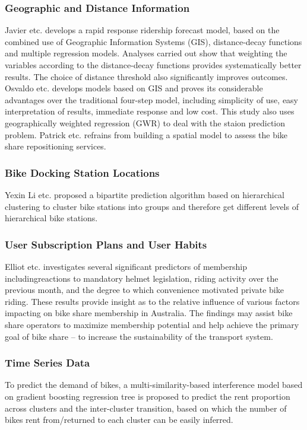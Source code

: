 \subsubsection{Geographic and Distance Information}
Javier etc.\cite{gu} develops a rapid response ridership forecast model, based on the combined use of Geographic Information Systems (GIS), distance-decay functions and multiple regression models. Analyses carried out show that weighting the variables according to the distance-decay functions provides systematically better results. The choice of distance threshold also significantly improves outcomes. Osvaldo etc. \cite{car} develops models based on GIS and proves its considerable advantages over the traditional four-step model, including simplicity of use, easy interpretation of results, immediate response and low cost. This study also uses geographically weighted regression (GWR) to deal with the staion prediction problem. Patrick etc.\cite{vogel} refrains from building a spatial model to assess the bike share repositioning services.

\subsubsection{Bike Docking Station Locations}
\par Yexin Li etc.\cite{Li} proposed a bipartite prediction algorithm based on hierarchical clustering to cluster bike stations into groups and therefore get different levels of hierarchical bike stations.

\subsubsection{User Subscription Plans and User Habits}
Elliot etc.\cite{fish} investigates several significant predictors of membership includingreactions to mandatory helmet legislation, riding activity over the previous month, and the degree to which convenience motivated private bike riding. These results provide insight as to the relative influence of various factors impacting on bike share membership in Australia. The findings may assist bike share operators to maximize membership potential and help achieve the primary goal of bike share – to increase the sustainability of the transport system.

\subsubsection{Time Series Data}
To predict the demand of bikes, a multi-similarity-based interference model based on gradient boosting regression tree is proposed to predict the rent proportion across clusters and the inter-cluster transition, based on which the number of bikes rent from/returned to each cluster can be easily inferred\cite{Li}. 

